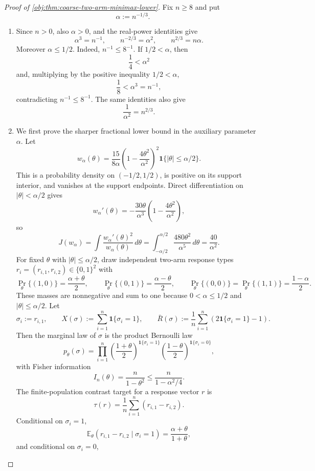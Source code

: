 \documentclass[11pt]{article}
\begin{document}
\begin{proof}[Proof of \cref{obj:thm:coarse-two-arm-minimax-lower}]
Fix \(n\ge 8\) and put
\[
\alpha:=n^{-1/3}.
\]
\begin{enumerate}
\item Since \(n>0\), also \(\alpha>0\), and the real-power identities give
\[
\alpha^3=n^{-1},\qquad
n^{-2/3}=\alpha^2,\qquad
n^{2/3}=n\alpha .
\]
Moreover \(\alpha\le 1/2\). Indeed, \(n^{-1}\le 8^{-1}\). If \(1/2<\alpha\), then
\[
\frac14<\alpha^2
\]
and, multiplying by the positive inequality \(1/2<\alpha\),
\[
\frac18<\alpha^3=n^{-1},
\]
contradicting \(n^{-1}\le 8^{-1}\). The same identities also give
\[
\frac1{\alpha^2}=n^{2/3}.
\]

\item We first prove the sharper fractional lower bound in the auxiliary parameter \(\alpha\). Let
\[
w_\alpha(\theta)
=
\frac{15}{8\alpha}
\left(1-\frac{4\theta^2}{\alpha^2}\right)^2
\mathbf 1\{|\theta|\le \alpha/2\}.
\]
This is a probability density on \((-1/2,1/2)\), is positive on its support interior, and vanishes at the support endpoints. Direct differentiation on \(|\theta|<\alpha/2\) gives
\[
w_\alpha'(\theta)
=
-\frac{30\theta}{\alpha^3}
\left(1-\frac{4\theta^2}{\alpha^2}\right),
\]
so
\[
J(w_\alpha)
=
\int \frac{w_\alpha'(\theta)^2}{w_\alpha(\theta)}\,d\theta
=
\int_{-\alpha/2}^{\alpha/2}\frac{480\theta^2}{\alpha^5}\,d\theta
=
\frac{40}{\alpha^2}.
\]
For fixed \(\theta\) with \(|\theta|\le \alpha/2\), draw independent two-arm response types \(r_i=(r_{i,1},r_{i,2})\in\{0,1\}^2\) with
\[
\Pr_\theta\{(1,0)\}=\frac{\alpha+\theta}{2},\qquad
\Pr_\theta\{(0,1)\}=\frac{\alpha-\theta}{2},\qquad
\Pr_\theta\{(0,0)\}=\Pr_\theta\{(1,1)\}=\frac{1-\alpha}{2}.
\]
These masses are nonnegative and sum to one because \(0<\alpha\le 1/2\) and \(|\theta|\le \alpha/2\). Let
\[
\sigma_i:=r_{i,1},\qquad
X(\sigma):=\sum_{i=1}^n \mathbf 1\{\sigma_i=1\},\qquad
\bar R(\sigma):=\frac1n\sum_{i=1}^n(2\mathbf 1\{\sigma_i=1\}-1).
\]
Then the marginal law of \(\sigma\) is the product Bernoulli law
\[
p_\theta(\sigma)
=
\prod_{i=1}^n
\left(\frac{1+\theta}{2}\right)^{\mathbf 1\{\sigma_i=1\}}
\left(\frac{1-\theta}{2}\right)^{\mathbf 1\{\sigma_i=0\}},
\]
with Fisher information
\[
I_n(\theta)=\frac{n}{1-\theta^2}
\le
\frac{n}{1-\alpha^2/4}.
\]
The finite-population contrast target for a response vector \(r\) is
\[
\tau(r)=\frac1n\sum_{i=1}^n(r_{i,1}-r_{i,2}).
\]
Conditional on \(\sigma_i=1\),
\[
\mathbb E_\theta(r_{i,1}-r_{i,2}\mid \sigma_i=1)=\frac{\alpha+\theta}{1+\theta},
\]
and conditional on \(\sigma_i=0\),

\end{enumerate}
\end{proof}
\end{document}
